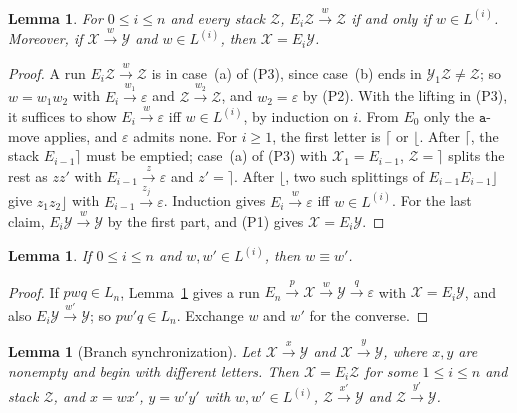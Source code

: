 \documentclass[11pt]{article}
\numberwithin{equation}{section}
\theoremstyle{plain}
\newtheorem{lemma}[theorem]{Lemma}
\theoremstyle{definition}
\theoremstyle{remark}
\newcommand{\eps}{\varepsilon}
\begin{document}
\begin{lemma}\label{lem:app-br-recognition}
For $0\le i\le n$ and every stack $\mathcal Z$,
$E_i\mathcal Z\xrightarrow{w}\mathcal Z$ if and only if $w\in L^{(i)}$. Moreover, if
$\mathcal X\xrightarrow{w}\mathcal Y$ and $w\in L^{(i)}$, then $\mathcal X=E_i\mathcal Y$.
\end{lemma}

\begin{proof}
A run $E_i\mathcal Z\xrightarrow{w}\mathcal Z$ is in case~(a) of (P3), since case~(b)
ends in $\mathcal Y_1\mathcal Z\ne\mathcal Z$; so $w=w_1w_2$ with
$E_i\xrightarrow{w_1}\eps$ and $\mathcal Z\xrightarrow{w_2}\mathcal Z$, and
$w_2=\eps$ by (P2). With the lifting in (P3), it suffices to show
$E_i\xrightarrow{w}\eps$ iff $w\in L^{(i)}$, by induction on $i$. From
$E_0$ only the $\mathtt a$-move applies, and $\eps$ admits none. For
$i\ge1$, the first letter is $\lceil$ or $\lfloor$. After $\lceil$, the
stack $E_{i-1}\rceil$ must be emptied; case~(a) of (P3) with
$\mathcal X_1=E_{i-1}$, $\mathcal Z=\rceil$ splits the rest as $zz'$ with
$E_{i-1}\xrightarrow{z}\eps$ and $z'=\rceil$. After $\lfloor$, two such
splittings of $E_{i-1}E_{i-1}\rfloor$ give $z_1z_2\rfloor$ with
$E_{i-1}\xrightarrow{z_j}\eps$. Induction gives
$E_i\xrightarrow{w}\eps$ iff $w\in L^{(i)}$. For the last claim,
$E_i\mathcal Y\xrightarrow{w}\mathcal Y$ by the first part, and (P1) gives
$\mathcal X=E_i\mathcal Y$.
\end{proof}

\begin{lemma}\label{lem:app-br-exchange}
If $0\le i\le n$ and $w,w'\in L^{(i)}$, then $w\equiv w'$.
\end{lemma}

\begin{proof}
If $pwq\in L_n$, Lemma~\ref{lem:app-br-recognition} gives a run
$E_n\xrightarrow{p}\mathcal X\xrightarrow{w}\mathcal Y\xrightarrow{q}\eps$ with
$\mathcal X=E_i\mathcal Y$, and also $E_i\mathcal Y\xrightarrow{w'}\mathcal Y$; so
$pw'q\in L_n$. Exchange $w$ and $w'$ for the converse.
\end{proof}

\begin{lemma}[Branch synchronization]\label{lem:app-br-branch}
Let $\mathcal X\xrightarrow{x}\mathcal Y$ and $\mathcal X\xrightarrow{y}\mathcal Y$, where
$x,y$ are nonempty and begin with different letters. Then
$\mathcal X=E_i\mathcal Z$ for some $1\le i\le n$ and stack $\mathcal Z$, and $x=wx'$,
$y=w'y'$ with $w,w'\in L^{(i)}$, $\mathcal Z\xrightarrow{x'}\mathcal Y$ and
$\mathcal Z\xrightarrow{y'}\mathcal Y$.
\end{lemma}
\end{document}
